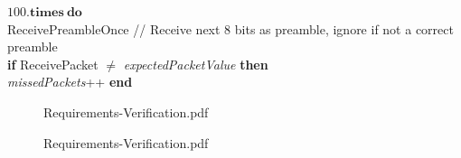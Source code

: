 \documentclass[letterpaper,10pt]{article}
\begin{document}
\begin{spacing}{1.15}
\begin{algorithm}[H]
\begin{algorithmic}[1]
		\State $100.\textbf{times}\ \textbf{do}$\\
		\quad ReceivePreambleOnce // Receive next 8 bits as preamble, ignore if not a correct preamble \\
		\quad \textbf{if} ReceivePacket $\neq$ \textit{expectedPacketValue} \textbf{then} \\
		\quad \quad \textit{missedPackets}++
		\State \textbf{end}
	\end{algorithmic}
\end{algorithm}
\clearpage

\begin{figure} [H]
	\centering
	 {Requirements-Verification.pdf}
\end{figure}
\clearpage

\begin{figure} [H]
	\centering
	 {Requirements-Verification.pdf}
\end{figure}

\end{spacing}
\end{document}
